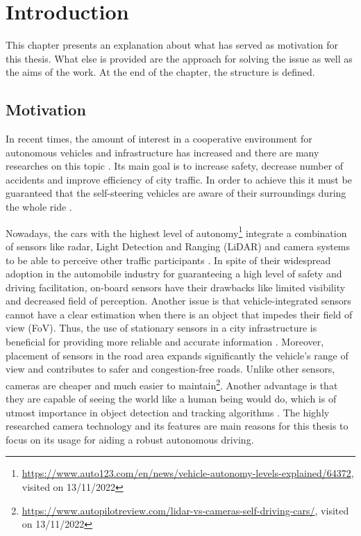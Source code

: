\chapter{Introduction}
\label{introduction}
This chapter presents an explanation about what has served as motivation for this thesis. What else is provided are the approach for solving the issue as well as the aims of the work. At the end of the chapter, the structure is defined.

\section{Motivation}
In recent times, the amount of interest in a cooperative environment for autonomous vehicles and infrastructure has increased and there are many researches on this topic \cite{ cvis_article_one, cvis_article_two}. Its main goal is to increase safety, decrease number of accidents and improve efficiency of city traffic. In order to achieve this it must be guaranteed that the self-steering vehicles are aware of their surroundings during the whole ride \cite{onboard_sensors}.

Nowadays, the cars with the highest level of autonomy\footnote{\url{https://www.auto123.com/en/news/vehicle-autonomy-levels-explained/64372}, visited on 13/11/2022} integrate a combination of sensors like radar, Light Detection and Ranging (LiDAR) and camera systems to be able to perceive other traffic participants \cite{autonomous_cars_sensors}. In spite of their widespread adoption in the automobile industry for guaranteeing a high level of safety and driving facilitation, on-board sensors have their drawbacks like limited visibility and decreased field of perception. Another issue is that vehicle-integrated sensors cannot have a clear estimation when there is an object that impedes their field of view (FoV). Thus, the use of stationary sensors in a city infrastructure is beneficial for providing more reliable and accurate information \cite{roadside_lidar}. Moreover, placement of sensors in the road area expands significantly the vehicle's range of view and contributes to safer and congestion-free roads. Unlike other sensors, cameras are cheaper and much easier to maintain\footnote{\url{https://www.autopilotreview.com/lidar-vs-cameras-self-driving-cars/}, visited on 13/11/2022}. Another advantage is that they are capable of seeing the world like a human being would do, which is of utmost importance in object detection and tracking algorithms \cite{camera_object_detection}. The highly researched camera technology and its features are main reasons for this thesis to focus on its usage for aiding a robust autonomous driving.


